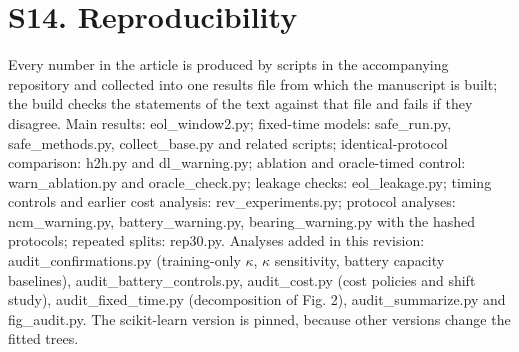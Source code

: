 \documentclass[11pt,a4paper]{article}
\begin{document}
\section*{S14. Reproducibility}

\noindent Every number in the article is produced by scripts in the accompanying repository and collected into one results file from which the manuscript is built; the build checks the statements of the text against that file and fails if they disagree. Main results: eol\_window2.py; fixed-time models: safe\_run.py, safe\_methods.py, collect\_base.py and related scripts; identical-protocol comparison: h2h.py and dl\_warning.py; ablation and oracle-timed control: warn\_ablation.py and oracle\_check.py; leakage checks: eol\_leakage.py; timing controls and earlier cost analysis: rev\_experiments.py; protocol analyses: ncm\_warning.py, battery\_warning.py, bearing\_warning.py with the hashed protocols; repeated splits: rep30.py. Analyses added in this revision: audit\_confirmations.py (training-only $\kappa$, $\kappa$ sensitivity, battery capacity baselines), audit\_battery\_controls.py, audit\_cost.py (cost policies and shift study), audit\_fixed\_time.py (decomposition of Fig. 2), audit\_summarize.py and fig\_audit.py. The scikit-learn version is pinned, because other versions change the fitted trees.
\end{document}
